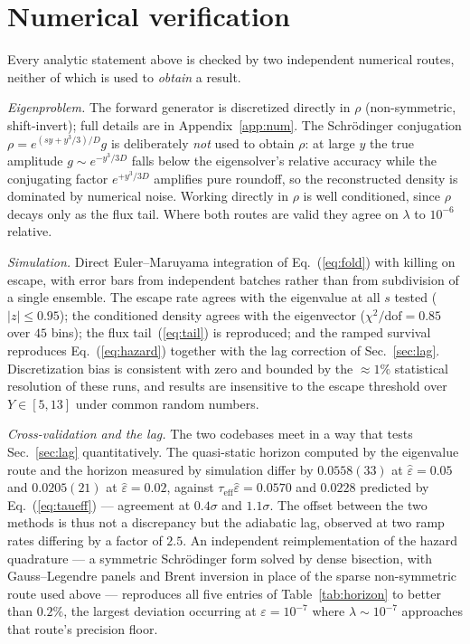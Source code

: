 \documentclass[%
 aip,
 cha,
 amsmath,amssymb,
 reprint,
 superscriptaddress,
 floatfix,
]{revtex4-2}
\newcommand{\Sig}{\hat\varepsilon}
\begin{document}
\section{\label{sec:num}Numerical verification}

Every analytic statement above is checked by two independent numerical routes, neither of which is used to \emph{obtain} a result.

\emph{Eigenproblem.}  The forward generator is discretized directly in $\rho$ (non-symmetric, shift-invert); full details are in Appendix~\ref{app:num}.  The Schr\"odinger conjugation $\rho=e^{(sy+y^3/3)/D}g$ is deliberately \emph{not} used to obtain $\rho$: at large $y$ the true amplitude $g\sim e^{-y^3/3D}$ falls below the eigensolver's relative accuracy while the conjugating factor $e^{+y^3/3D}$ amplifies pure roundoff, so the reconstructed density is dominated by numerical noise.  Working directly in $\rho$ is well conditioned, since $\rho$ decays only as the flux tail.  Where both routes are valid they agree on $\lambda$ to $10^{-6}$ relative.

\emph{Simulation.}  Direct Euler--Maruyama integration of Eq.~(\ref{eq:fold}) with killing on escape, with error bars from independent batches rather than from subdivision of a single ensemble.  The escape rate agrees with the eigenvalue at all $s$ tested ($|z|\le0.95$); the conditioned density agrees with the eigenvector ($\chi^2/\mathrm{dof}=0.85$ over $45$ bins); the flux tail~(\ref{eq:tail}) is reproduced; and the ramped survival reproduces Eq.~(\ref{eq:hazard}) together with the lag correction of Sec.~\ref{sec:lag}.  Discretization bias is consistent with zero and bounded by the ${\approx}1\%$ statistical resolution of these runs, and results are insensitive to the escape threshold over $Y\in[5,13]$ under common random numbers.

\emph{Cross-validation and the lag.}  The two codebases meet in a way that tests Sec.~\ref{sec:lag} quantitatively.  The quasi-static horizon computed by the eigenvalue route and the horizon measured by simulation differ by $0.0558(33)$ at $\Sig=0.05$ and $0.0205(21)$ at $\Sig=0.02$, against $\tau_{\mathrm{eff}}\Sig=0.0570$ and $0.0228$ predicted by Eq.~(\ref{eq:taueff}) --- agreement at $0.4\sigma$ and $1.1\sigma$.  The offset between the two methods is thus not a discrepancy but the adiabatic lag, observed at two ramp rates differing by a factor of $2.5$.  An independent reimplementation of the hazard quadrature --- a symmetric Schr\"odinger form solved by dense bisection, with Gauss--Legendre panels and Brent inversion in place of the sparse non-symmetric route used above --- reproduces all five entries of Table~\ref{tab:horizon} to better than $0.2\%$, the largest deviation occurring at $\varepsilon=10^{-7}$ where $\lambda\sim10^{-7}$ approaches that route's precision floor.
\end{document}
